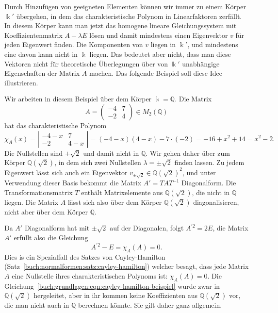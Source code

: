 Durch Hinzufügen von geeigneten Elementen können wir immer zu einem 
Körper $\Bbbk'$ übergehen, in dem das charakteristische Polynom
in Linearfaktoren zerfällt.
In diesem Körper kann man jetzt das homogene lineare Gleichungssystem
mit Koeffizientenmatrix $A-\lambda E$ lösen und damit mindestens 
einen Eigenvektor $v$ für jeden Eigenwert finden.
Die Komponenten von $v$ liegen in $\Bbbk'$, und mindestens eine davon kann
nicht in $\Bbbk$ liegen.
Das bedeutet aber nicht, dass man diese Vektoren nicht für theoretische
Überlegungen über von $\Bbbk'$ unabhängige Eigenschaften der Matrix $A$ machen.
Das folgende Beispiel soll diese Idee illustrieren.

\begin{beispiel}
Wir arbeiten in diesem Beispiel über dem Körper $\Bbbk=\mathbb{Q}$.
Die Matrix
\[
A=\begin{pmatrix}
-4&7\\
-2&4
\end{pmatrix}
\in
M_2(\mathbb{Q})
\]
hat das charakteristische Polynom
\[
\chi_A(x)
=
\left|
\begin{matrix}
-4-x&7\\-2&4-x
\end{matrix}
\right|
=
(-4-x)(4-x)-7\cdot(-2)
=
-16+x^2+14
=
x^2-2.
\]
Die Nullstellen sind $\pm\sqrt{2}$ und damit nicht in $\mathbb{Q}$.
Wir gehen daher über zum Körper $\mathbb{Q}(\!\sqrt{2})$, in dem
sich zwei Nullstellen $\lambda=\pm\sqrt{2}$ finden lassen.
Zu jedem Eigenwert lässt sich auch ein Eigenvektor
$v_{\pm\sqrt{2}}\in \mathbb{Q}(\!\sqrt{2})^2$, und unter Verwendung dieser
Basis bekommt die Matrix $A'=TAT^{-1}$ Diagonalform.
Die Transformationsmatrix $T$ enthält Matrixelemente aus
$\mathbb{Q}(\!\sqrt{2})$, die nicht in $\mathbb{Q}$ liegen.
Die Matrix $A$ lässt sich also über dem Körper $\mathbb{Q}(\!\sqrt{2})$
diagonalisieren, nicht aber über dem Körper $\mathbb{Q}$.

Da $A'$ Diagonalform hat mit $\pm\sqrt{2}$ auf der Diagonalen, folgt
$A^{\prime 2} = 2E$, die Matrix $A'$ erfüllt also die Gleichung
\begin{equation}
A^{\prime 2}-E= \chi_{A}(A) = 0.
\label{buch:grundlagen:eqn:cayley-hamilton-beispiel}
\end{equation}
Dies is ein Spezialfall des Satzes von Cayley-Hamilton
(Satz~\ref{buch:normalformen:satz:cayley-hamilton})
welcher besagt, dass jede Matrix $A$ eine Nullstelle ihres 
charakteristischen Polynoms ist: $\chi_A(A)=0$.
Die Gleichung~\ref{buch:grundlagen:eqn:cayley-hamilton-beispiel}
wurde zwar in $\mathbb{Q}(\!\sqrt{2})$ hergeleitet, aber in ihr kommen
keine Koeffizienten aus $\mathbb{Q}(\!\sqrt{2})$ vor, die man nicht auch
in $\mathbb{Q}$ berechnen könnte.
Sie gilt daher ganz allgemein.
\end{beispiel}

